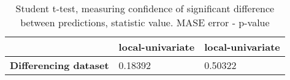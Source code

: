 \begin{table}[h]
\centering
\caption{Student t-test, measuring confidence of significant difference between predictions, statistic value. MASE error - p-value}
\label{table:ttest-p-values-differencing-experiments-MASE}
\begin{tabular}{lll}
\toprule
{} & local-univariate & local-univariate \\
\midrule
\textbf{Differencing dataset} &          0.18392 &          0.50322 \\
\bottomrule
\end{tabular}
\end{table}
